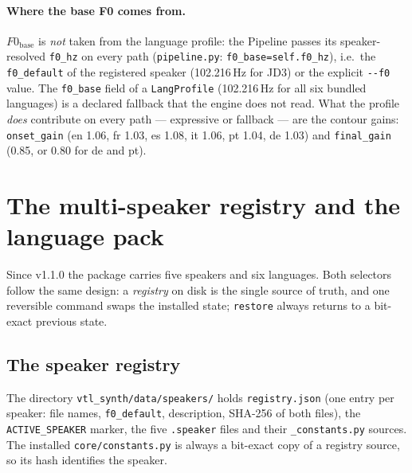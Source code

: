 \documentclass[11pt,a4paper]{article}
\begin{document}
\paragraph{Where the base F0 comes from.} \(F0_{\mathrm{base}}\) is
\emph{not} taken from the language profile: the Pipeline passes its
speaker-resolved \texttt{f0\_hz} on every path
(\texttt{pipeline.py}: \texttt{f0\_base=self.f0\_hz}), i.e.\ the
\texttt{f0\_default} of the registered speaker (102.216\,Hz for JD3)
or the explicit \texttt{-{}-f0} value. The \texttt{f0\_base} field of
a \texttt{LangProfile} (102.216\,Hz for all six bundled languages) is a
declared fallback that the engine does not read. What the profile
\emph{does} contribute on every path --- expressive or fallback --- are
the contour gains: \texttt{onset\_gain} (en 1.06, fr 1.03, es 1.08,
it 1.06, pt 1.04, de 1.03) and \texttt{final\_gain} (0.85, or 0.80 for
de and pt).

\section{The multi-speaker registry and the language pack}\label{sec:multispeaker}

Since v1.1.0 the package carries five speakers and six languages.
Both selectors follow the same design: a \emph{registry} on disk is
the single source of truth, and one reversible command swaps the
installed state; \texttt{restore} always returns to a bit-exact
previous state.

\subsection{The speaker registry}

The directory \texttt{vtl\_synth/data/speakers/} holds
\texttt{registry.json} (one entry per speaker: file names,
\texttt{f0\_default}, description, SHA-256 of both files), the
\texttt{ACTIVE\_SPEAKER} marker, the five \texttt{.speaker} files and
their \texttt{\_constants.py} sources. The installed
\texttt{core/constants.py} is always a bit-exact copy of a registry
source, so its hash identifies the speaker.
\end{document}

